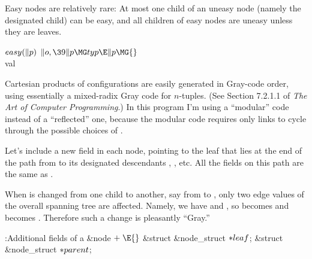 Easy nodes are relatively rare: At most one child of an uneasy node
(namely the designated child) can be easy, and all children of easy nodes
are uneasy unless they are leaves.

\Y\B\4\D$\\{easy}(\|p)$ \5
$\|o,\39\|p\MG\\{typ}\E\|p\MG{}$\\{val}\par
\fi

Cartesian products of configurations are easily generated in Gray-code
order, using essentially a mixed-radix Gray code for $n$-tuples.
(See Section 7.2.1.1 of {\sl The Art of Computer Programming}.) In this
program I'm using a ``modular'' code instead of a ``reflected'' one, because
the modular code requires only  links to cycle through the
possible choices of .

Let's include a new field  in each node, pointing to the
leaf
that lies at the end of the path from  to its designated
descendants , , etc. All the %
 fields
on this path are the same as .

When  is changed from one child to another, say from  to ,
only two edge values of the overall spanning tree are affected.
Namely, we have  and , so
 becomes  and 
becomes . Therefore such a change is pleasantly ``Gray.''

\Y\B\4:Additional fields of a \&{node}\X${}\mathrel+\E{}$\6
\&{struct} \&{node\_struct} ${}{*}\\{leaf}{}$;\6
\&{struct} \&{node\_struct} ${}{*}\\{parent}{}$;\par
\fi

